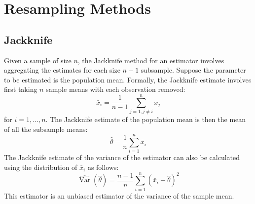 \documentclass[11pt]{report} %
\begin{document}
\section{Resampling Methods}

\subsection{Jackknife}

Given a sample of size $n$, the Jackknife method for an estimator involves aggregating the estimates for each size $n - 1$ subsample. Suppose the parameter to be estimated is the population mean. Formally, the Jackknife estimate involves first taking $n$ sample means with each observation removed:
\begin{equation}
\bar{x}_{i} = \dfrac{1}{n - 1}\sum_{j = 1, j\neq i}^{n}x_{j}
\end{equation}
for $i = 1, \dots, n$. The Jackknife estimate of the population mean is then the mean of all the subsample means:
\begin{equation}
\hat{\theta} = \dfrac{1}{n}\sum_{i = 1}^{n}\bar{x}_{i}
\end{equation}
The Jackknife estimate of the variance of the estimator can also be calculated using the distribution of $\bar{x}_{i}$ as follows:
\begin{equation}
\widehat{\operatorname{Var}}\left(\hat{\theta}\right) = \dfrac{n - 1}{n}\sum_{i = 1}^{n}\left(\bar{x}_{i} - \hat{\theta}\right)^{2}
\end{equation}
This estimator is an unbiased estimator of the variance of the sample mean.
\end{document}
